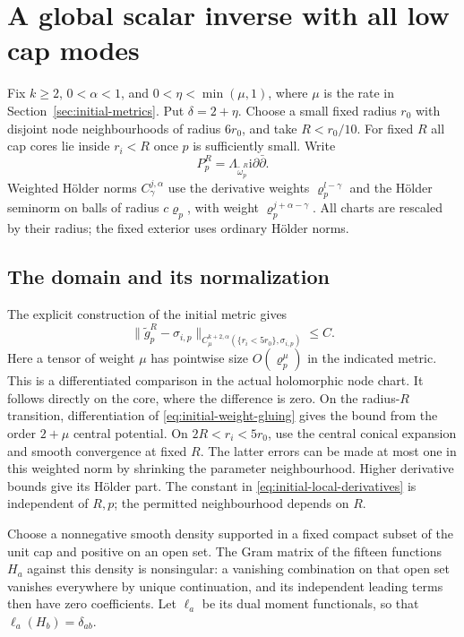 \section{A global scalar inverse with all low cap modes}
\label{sec:global-inverse}

Fix $k\ge2$, $0<\alpha<1$, and
$0<\eta<\min(\mu,1)$, where $\mu$ is the rate in
Section~\ref{sec:initial-metrics}. Put $\delta=2+\eta$.
Choose a small fixed radius $r_0$ with disjoint node
neighbourhoods of radius $6r_0$, and take $R<r_0/10$.
For fixed $R$ all cap cores lie inside $r_i<R$ once
$p$ is sufficiently small. Write
\[
 P_p^R=\Lambda_{\widetilde\omega_p^R}
                           \mathrm i\partial\bar\partial.
\]
Weighted Hölder norms $C^{j,\alpha}_\gamma$ use the derivative
weights $\varrho_p^{l-\gamma}$ and the Hölder seminorm on
balls of radius $c\varrho_p$, with weight
$\varrho_p^{j+\alpha-\gamma}$. All charts are rescaled by
their radius; the fixed exterior uses ordinary Hölder norms.

\subsection{The domain and its normalization}

The explicit construction of the initial metric gives
\begin{equation}\label{eq:initial-local-derivatives}
 \|\widetilde g_p^R-\sigma_{i,p}\|_{C^{k+2,\alpha}_\mu
                            (\{r_i<5r_0\},\sigma_{i,p})}
       \le C.
\end{equation}
Here a tensor of weight $\mu$ has pointwise size
$O(\varrho_p^\mu)$ in the indicated metric.
This is a differentiated comparison in the actual
holomorphic node chart. It follows directly on the
core, where the difference is zero. On the radius-$R$
transition, differentiation of
\eqref{eq:initial-weight-gluing} gives the bound from
the order $2+\mu$ central potential. On
$2R<r_i<5r_0$, use the central conical expansion and
smooth convergence at fixed $R$. The latter errors
can be made at most one in this weighted norm by
shrinking the parameter neighbourhood. Higher
derivative bounds give its Hölder part. The constant
in \eqref{eq:initial-local-derivatives} is independent
of $R,p$; the permitted neighbourhood depends on $R$.

Choose a nonnegative smooth density supported in a
fixed compact subset of the unit cap and positive
on an open set. The Gram matrix of the fifteen
functions $H_a$ against this density is nonsingular:
a vanishing combination on that open set vanishes
everywhere by unique continuation, and its independent
leading terms then have zero coefficients. Let
$\ell_a$ be its dual moment functionals, so that
$\ell_a(H_b)=\delta_{ab}$.

